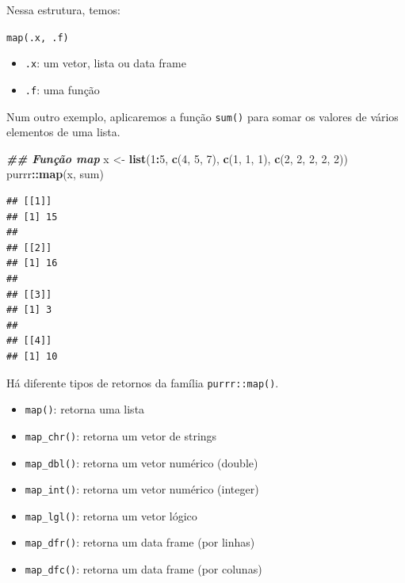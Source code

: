 \documentclass[
]{article}
\newenvironment{Shaded}{\begin{snugshade}}{\end{snugshade}}
\newcommand{\DecValTok}[1]{\textcolor[rgb]{0.00,0.00,0.81}{#1}}
\newcommand{\DocumentationTok}[1]{\textcolor[rgb]{0.56,0.35,0.01}{\textbf{\textit{#1}}}}
\newcommand{\FunctionTok}[1]{\textcolor[rgb]{0.13,0.29,0.53}{\textbf{#1}}}
\newcommand{\NormalTok}[1]{#1}
\newcommand{\OtherTok}[1]{\textcolor[rgb]{0.56,0.35,0.01}{#1}}
\newcommand{\SpecialCharTok}[1]{\textcolor[rgb]{0.81,0.36,0.00}{\textbf{#1}}}
\providecommand{\tightlist}{%
  \setlength{\itemsep}{0pt}\setlength{\parskip}{0pt}}
\begin{document}
Nessa estrutura, temos:

\texttt{map(.x,\ .f)}

\begin{itemize}
\tightlist
\item
  \texttt{.x}: um vetor, lista ou data frame
\item
  \texttt{.f}: uma função
\end{itemize}

Num outro exemplo, aplicaremos a função \texttt{sum()} para somar os valores de vários elementos de uma lista.

\begin{Shaded}
\begin{Highlighting}[]
\DocumentationTok{\#\# Função map}
\NormalTok{x }\OtherTok{\textless{}{-}} \FunctionTok{list}\NormalTok{(}\DecValTok{1}\SpecialCharTok{:}\DecValTok{5}\NormalTok{, }\FunctionTok{c}\NormalTok{(}\DecValTok{4}\NormalTok{, }\DecValTok{5}\NormalTok{, }\DecValTok{7}\NormalTok{), }\FunctionTok{c}\NormalTok{(}\DecValTok{1}\NormalTok{, }\DecValTok{1}\NormalTok{, }\DecValTok{1}\NormalTok{), }\FunctionTok{c}\NormalTok{(}\DecValTok{2}\NormalTok{, }\DecValTok{2}\NormalTok{, }\DecValTok{2}\NormalTok{, }\DecValTok{2}\NormalTok{, }\DecValTok{2}\NormalTok{))}
\NormalTok{purrr}\SpecialCharTok{::}\FunctionTok{map}\NormalTok{(x, sum)}
\end{Highlighting}
\end{Shaded}

\begin{verbatim}
## [[1]]
## [1] 15
## 
## [[2]]
## [1] 16
## 
## [[3]]
## [1] 3
## 
## [[4]]
## [1] 10
\end{verbatim}

Há diferente tipos de retornos da família \texttt{purrr::map()}.

\begin{itemize}
\tightlist
\item
  \texttt{map()}: retorna uma lista
\item
  \texttt{map\_chr()}: retorna um vetor de strings
\item
  \texttt{map\_dbl()}: retorna um vetor numérico (double)
\item
  \texttt{map\_int()}: retorna um vetor numérico (integer)
\item
  \texttt{map\_lgl()}: retorna um vetor lógico
\item
  \texttt{map\_dfr()}: retorna um data frame (por linhas)
\item
  \texttt{map\_dfc()}: retorna um data frame (por colunas)
\end{itemize}
\end{document}
